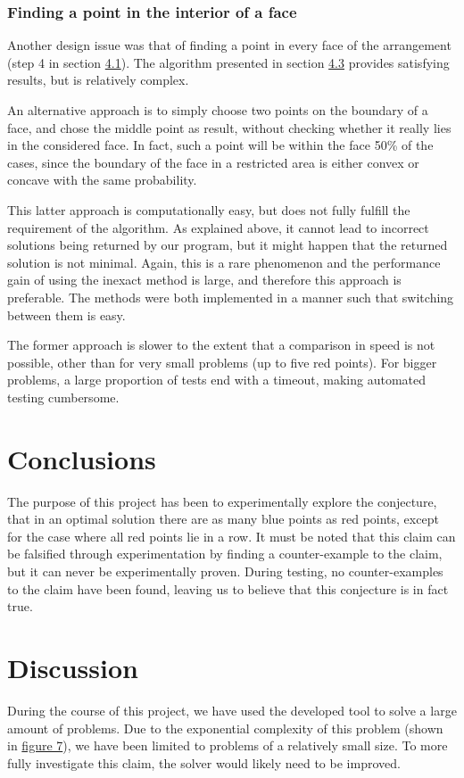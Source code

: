 \documentclass[a4paper,12pt]{article}
\begin{document}
\subsubsection*{Finding a point in the interior of a face}

Another design issue was that of finding a point in every face of the arrangement (step 4 in section \hyperref[ref:Algorithm]{4.1}). The algorithm presented in section \hyperref[sec:findPoints]{4.3} provides satisfying results, but is relatively complex.

An alternative approach is to simply choose two points on the boundary of a face, and chose the middle point as result, without checking whether it really lies in the considered face. In fact, such a point will be within the face 50\% of the cases, since the boundary of the face in a restricted area is either convex or concave with the same probability. 

This latter approach is computationally easy, but does not fully fulfill the requirement of the algorithm. As explained above, it cannot lead to incorrect solutions being returned by our program, but it might happen that the returned solution is not minimal. Again, this is a rare phenomenon and the performance gain of using the inexact method is large, and therefore this approach is preferable. The methods were both implemented in a manner such that switching between them is easy.

The former approach is slower to the extent that a comparison in speed is not possible, other than for very small problems (up to five red points). For bigger problems, a large proportion of tests end with a timeout, making automated testing cumbersome.


\section{Conclusions}
The purpose of this project has been to experimentally explore the conjecture, that in an optimal solution there are as many blue points as red points, except for the case where all red points lie in a row. It must be noted that this claim can be falsified through experimentation by finding a counter-example to the claim, but it can never be experimentally proven. During testing, no counter-examples to the claim have been found, leaving us to believe that this conjecture is in fact true.

\section{Discussion}
During the course of this project, we have used the developed tool to solve a large amount of problems. Due to the exponential complexity of this problem (shown in \hyperref[ref:speed] {figure 7}), we have been limited to problems of a relatively small size. To more fully investigate this claim, the solver would likely need to be improved.
\end{document}
